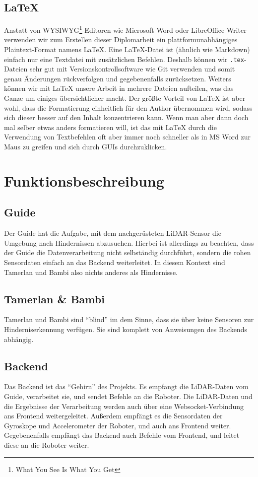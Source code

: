 \subsection{\LaTeX}
\label{subsec:latex}
Anstatt von WYSIWYG\footnote{What You See Is What You Get}-Editoren
wie Microsoft Word oder LibreOffice Writer verwenden wir zum Erstellen dieser Diplomarbeit
ein plattformunabhängiges Plaintext-Format namens \LaTeX \cite{latex}.
Eine LaTeX-Datei ist (ähnlich wie Markdown) einfach nur eine Textdatei mit zusätzlichen Befehlen.
Deshalb können wir \texttt{.tex}-Dateien sehr gut mit Versionskontrollsoftware wie Git verwenden
und somit genau Änderungen rückverfolgen und gegebenenfalls zurücksetzen.
%
Weiters können wir mit LaTeX unsere Arbeit in mehrere Dateien aufteilen,
was das Ganze um einiges übersichtlicher macht.
%
Der größte Vorteil von LaTeX ist aber wohl,
dass die Formatierung einheitlich für den Author übernommen wird,
sodass sich dieser besser auf den Inhalt konzentrieren kann.
%
Wenn man aber dann doch mal selber etwas anders formatieren will,
ist das mit LaTeX durch die Verwendung von Textbefehlen oft
aber immer noch schneller als in MS Word zur Maus zu greifen
und sich durch GUIs durchzuklicken.

\section{Funktionsbeschreibung}
\label{subsec:funktionsbeschreibung}

\subsection{Guide}
Der Guide hat die Aufgabe,
mit dem nachgerüsteten LiDAR-Sensor die Umgebung nach Hindernissen abzusuchen.
%
Hierbei ist allerdings zu beachten,
dass der Guide die Datenverarbeitung nicht selbständig durchführt,
sondern die rohen Sensordaten einfach an das Backend weiterleitet.
%
In diesem Kontext sind Tamerlan und Bambi also nichts anderes als Hindernisse.

\subsection{Tamerlan \& Bambi}
Tamerlan und Bambi sind ``blind'' im dem Sinne,
dass sie über keine Sensoren zur Hinderniserkennung verfügen.
%
Sie sind komplett von Anweisungen des Backends abhängig.

\subsection{Backend}
Das Backend ist das ``Gehirn'' des Projekts.
%
Es empfangt die LiDAR-Daten vom Guide,
verarbeitet sie,
und sendet Befehle an die Roboter.
%
Die LiDAR-Daten und die Ergebnisse der Verarbeitung werden auch
über eine Websocket-Verbindung ans Frontend weitergeleitet.
%
Außerdem empfängt es die Sensordaten der Gyroskope und Accelerometer der Roboter, und auch ans Frontend weiter. 
%
Gegebenenfalls empfängt das Backend auch Befehle vom Frontend, und leitet diese an die Roboter weiter.

